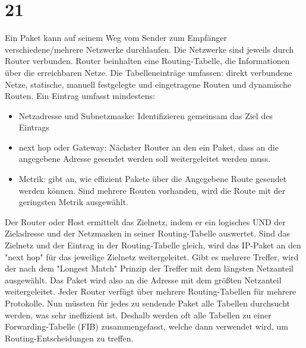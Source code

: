 \documentclass[12pt, a4paper]{article}
\begin{document}
	\section{21}
	Ein Paket kann auf seinem Weg vom Sender zum Empfänger verschiedene/mehrere Netzwerke durchlaufen. Die Netzwerke sind
	jeweils durch Router verbunden. Router beinhalten eine Routing-Tabelle, die Informationen über die erreichbaren Netze.
	Die Tabelleneinträge umfassen: direkt verbundene Netze, statische, manuell festgelegte und eingetragene Routen und dynamische Routen.
	Ein Eintrag umfasst mindestens:
	\begin{itemize}
		\item Netzadresse und Subnetzmaske: Identifizieren gemeinsam das Ziel  des Eintrags
		\item next hop oder Gateway: Nächster Router an den ein Paket, dass an die angegebene Adresse gesendet werden soll
		weitergeleitet werden muss.
		\item Metrik: gibt an, wie effizient Pakete über die Angegebene Route gesendet werden können. Sind mehrere Routen
		vorhanden, wird die Route mit der geringsten Metrik ausgewählt.
	\end{itemize}
	Der Router oder Host ermittelt das Zielnetz, indem er ein logisches UND der Zieladresse und der Netzmasken in seiner Routing-Tabelle auswertet. Sind das Zielnetz und der Eintrag in der Routing-Tabelle gleich, wird das IP-Paket an den "next hop" für das jeweilige Zielnetz weitergeleitet. Gibt es mehrere Treffer, wird der nach dem "Longest Match" Prinzip der Treffer mit dem längsten Netzanteil ausgewählt. Das Paket wird also an die Adresse mit dem größten Netzanteil weitergeleitet. Jeder Router verfügt über mehrere Routing-Tabellen für mehrere Protokolle. Nun müssten für jedes zu sendende Paket alle Tabellen durchsucht werden, was sehr ineffizient ist. Deshalb werden oft alle Tabellen zu einer Forwarding-Tabelle (FIB) zusammengefasst, welche dann verwendet wird, um Routing-Entscheidungen zu treffen.
	
\end{document}
